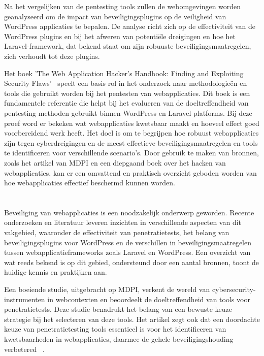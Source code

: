 Na het vergelijken van de pentesting tools zullen de webomgevingen worden geanalyseerd om de impact van beveiligingsplugins op de veiligheid 
van WordPress applicaties te bepalen. De analyse richt zich op de effectiviteit van de WordPress plugins en bij het afweren van potentiële dreigingen en hoe 
het Laravel-framework, dat bekend staat om zijn robuuste beveiligingsmaatregelen, zich verhoudt tot deze plugins.

Het boek 'The Web Application Hacker's Handbook: Finding and Exploiting Security Flaws'~\autocite{Stuttard2011} speelt een basis rol in het onderzoek 
naar methodologieën en tools die gebruikt worden bij het pentesten van webapplicaties. Dit boek is een fundamentele referentie die helpt bij het 
evalueren van de doeltreffendheid van pentesting methoden gebruikt binnen WordPress en Laravel platforms.
Bij deze proef word er bekeken wat webapplicaties kwetsbaar maakt en hoeveel effect goed voorbereidend werk heeft. Het doel is om te begrijpen hoe robuust webapplicaties 
zijn tegen cyberdreigingen en de meest effectieve beveiligingsmaatregelen en tools te identificeren voor verschillende scenario's. Door gebruik te maken van bronnen, 
zoals het artikel van MDPI en een diepgaand boek over het hacken van webapplicaties, kan er een omvattend en praktisch overzicht geboden worden van 
hoe webapplicaties effectief beschermd kunnen worden.

\section{}
\label{sec:wat-weten-we-uit-de-literatuur}
Beveiliging van webapplicaties is een noodzakelijk onderwerp geworden. Recente onderzoeken en literatuur leveren 
inzichten in verschillende aspecten van dit vakgebied, waaronder de effectiviteit van penetratietests, het belang van beveiligingsplugins voor WordPress en de verschillen 
in beveiligingsmaatregelen tussen webapplicatieframeworks zoals Laravel en WordPress. Een overzicht van wat reeds bekend is op dit gebied, ondersteund door een aantal 
bronnen, toont de huidige kennis en praktijken aan.

Een boeiende studie, uitgebracht op MDPI, verkent de wereld van cybersecurity-instrumenten in webcontexten en beoordeelt de doeltreffendheid van tools voor penetratietests.
Deze studie benadrukt het belang van een bewuste keuze strategie bij het selecteren van deze tools. Het artikel zegt ook dat 
een doordachte keuze van penetratietesting tools essentieel is voor het identificeren van kwetsbaarheden in webapplicaties, daarmee de gehele beveiligingshouding 
verbetered ~\autocite{Albahar2022}.

